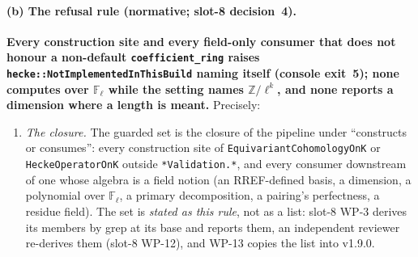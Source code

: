 \documentclass[11pt]{article}
\theoremstyle{remark}
\newcommand{\F}{\mathbb{F}}
\newcommand{\Z}{\mathbb{Z}}
\newcommand{\Fl}{\F_\ell}
\begin{document}
\paragraph{(b) The refusal rule (normative; slot-8 decision~4).}
\textbf{Every construction site and every field-only consumer that does not honour a non-default
\texttt{coefficient\_ring} raises \texttt{hecke::NotImplementedInThisBuild} naming itself
(console exit~5); none computes over $\Fl$ while the setting names $\Z/\ell^k$, and none reports a
dimension where a length is meant.} Precisely:
\begin{enumerate}[label=(b\arabic*)]
\item \emph{The closure.} The guarded set is the closure of the pipeline under ``constructs or
  consumes'': every construction site of \texttt{EquivariantCohomologyOnK} or
  \texttt{HeckeOperatorOnK} outside \texttt{*Validation.*}, and every consumer downstream of one
  whose algebra is a field notion (an RREF-defined basis, a dimension, a polynomial over $\Fl$, a
  primary decomposition, a pairing's perfectness, a residue field). The set is \emph{stated as this
  rule}, not as a list: slot-8 WP-3 derives its members by grep at its base and reports them, an
  independent reviewer re-derives them (slot-8 WP-12), and WP-13 copies the list into v1.9.0.


\end{enumerate}
\end{document}
